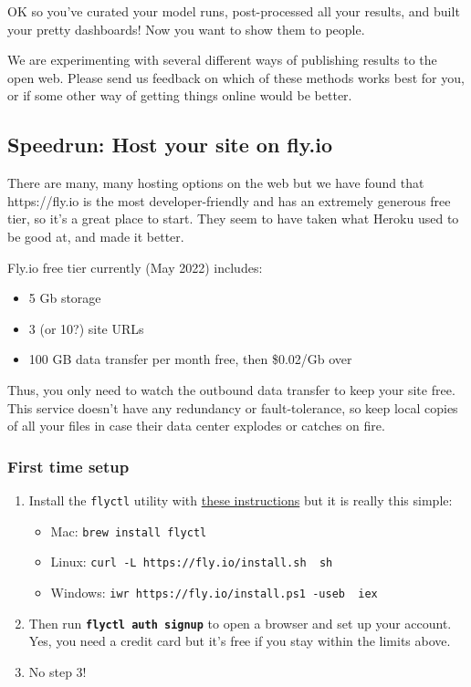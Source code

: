 OK so you've curated your model runs, post-processed all your results,
and built your pretty dashboards! Now you want to show them to people.

We are experimenting with several different ways of publishing results
to the open web. Please send us feedback on which of these methods works
best for you, or if some other way of getting things online would be
better.

\hypertarget{speedrun-host-your-site-on-fly.io}{%
\subsection{Speedrun: Host your site on
fly.io}\label{speedrun-host-your-site-on-fly.io}}

There are many, many hosting options on the web but we have found that
https://fly.io is the most developer-friendly and has an extremely
generous free tier, so it's a great place to start. They seem to have
taken what Heroku used to be good at, and made it better.

Fly.io free tier currently (May 2022) includes:

\begin{itemize}
\tightlist
\item
  5 Gb storage
\item
  3 (or 10?) site URLs
\item
  100 GB data transfer per month free, then \$0.02/Gb over
\end{itemize}

Thus, you only need to watch the outbound data transfer to keep your
site free. This service doesn't have any redundancy or fault-tolerance,
so keep local copies of all your files in case their data center
explodes or catches on fire.

\hypertarget{first-time-setup}{%
\subsubsection{First time setup}\label{first-time-setup}}

\begin{enumerate}
\def\labelenumi{\arabic{enumi}.}
\item
  Install the \texttt{flyctl} utility with
  \href{https://fly.io/docs/getting-started/installing-flyctl/}{these
  instructions} but it is really this simple:

  \begin{itemize}
  \tightlist
  \item
    Mac: \texttt{brew\ install\ flyctl}
  \item
    Linux: \texttt{curl\ -L\ https://fly.io/install.sh\ \textbar{}\ sh}
  \item
    Windows:
    \texttt{iwr\ https://fly.io/install.ps1\ -useb\ \textbar{}\ iex}
  \end{itemize}
\item
  Then run \textbf{\texttt{flyctl\ auth\ signup}} to open a browser and
  set up your account. Yes, you need a credit card but it's free if you
  stay within the limits above.
\item
  No step 3!
\end{enumerate}

